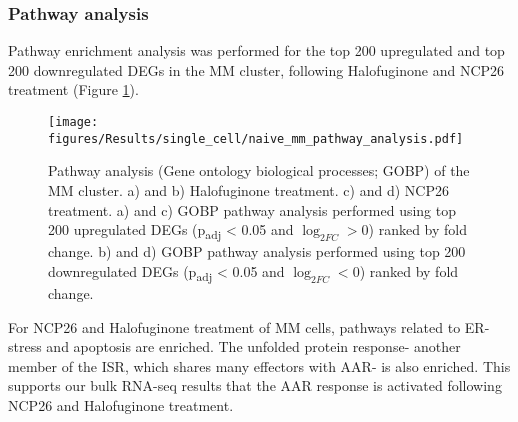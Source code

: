 \subsubsection{Pathway analysis}
Pathway enrichment analysis was performed for the top 200 upregulated and top 200 downregulated DEGs in the MM cluster, following Halofuginone and NCP26 treatment (Figure \ref{fig:naive_mm_pathway_analysis}).
\begin{figure}[htb]
\centering
\texttt{[image: figures/Results/single\_cell/naive\_mm\_pathway\_analysis.pdf]}
\caption[scRNA-seq MM cluster pathway analysis (newly-diagnosed MM)]{Pathway analysis (Gene ontology biological processes; GOBP) of the MM cluster.
    a) and b) Halofuginone treatment.
    c) and d) NCP26 treatment.
a) and c) GOBP pathway analysis performed using top 200 upregulated DEGs (p\textsubscript{adj} < 0.05 and $\log_{2FC}>0$) ranked by fold change.
b) and d) GOBP pathway analysis performed using top 200 downregulated DEGs (p\textsubscript{adj} < 0.05 and $\log_{2FC}<0$) ranked by fold change.}
\label{fig:naive_mm_pathway_analysis}
\end{figure}

For NCP26 and Halofuginone treatment of MM cells, pathways related to ER-stress and apoptosis are enriched.
The unfolded protein response- another member of the ISR, which shares many effectors with AAR- is also enriched.
This supports our bulk RNA-seq results that the AAR response is activated following NCP26 and Halofuginone treatment.

